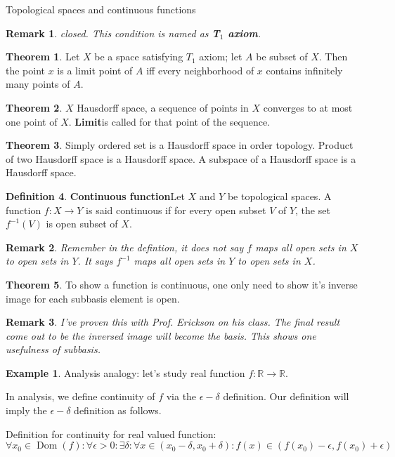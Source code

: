 \documentclass{report}
\newtheorem*{remark}{Remark}
\theoremstyle{definition}
\newtheorem{theorem}{Theorem}[chapter]
\newtheorem{definition}[theorem]{Definition}
\newtheorem{example}{Example}[theorem]
\newcommand{\defn}[1]{\textbf{#1}\label{#1}\index{#1}}
\newcommand{\RR}{\mathbb{R}}
\begin{document}
\begin{chapter}{Topological spaces and continuous functions}
\begin{remark}
    closed. This condition is named as \defn{T$_1$ axiom}.
  \end{remark}
  \begin{theorem}
    Let $X$ be a space satisfying $T_1$ axiom; let $A$ be subset of
    $X$. Then the point $x$ is a limit point of $A$ iff every
    neighborhood of $x$ contains infinitely many points of $A$.
  \end{theorem}
  \begin{theorem}
    $X$ Hausdorff space, a sequence of points in $X$ converges to at
    most one point of $X$. \defn{Limit} is called for that point
    of the sequence.
  \end{theorem}
  \begin{theorem}
    Simply ordered set is a Hausdorff space in order topology.
    Product of two Hausdorff space is a Hausdorff space.
    A subspace of a Hausdorff space is a Hausdorff space.
  \end{theorem}
  \begin{definition}\defn{Continuous function}
    Let $X$ and $Y$ be topological spaces. A function $f:X\to Y$ is
    said continuous if for every open subset $V$ of $Y$, the set
    $f^{-1}(V)$ is open subset of $X$.
  \end{definition}
  \begin{remark}
    Remember in the defintion, it does not say $f$ maps all open sets
    in $X$ to open sets in $Y$. It says $f^{-1}$ maps all open sets in
    $Y$ to open sets in $X$.
  \end{remark}
  \begin{theorem}
    To show a function is continuous, one only need to show it's
    inverse image for each subbasis element is open.
  \end{theorem}
  \begin{remark}
    I've proven this with Prof. Erickson on his class. The final
    result come out to be the inversed image will become the basis.
    This shows one usefulness of subbasis.
  \end{remark}
  \begin{example}
    Analysis analogy: let's study real function $f : \RR \to \RR$.

    In analysis, we define continuity of $f$ via the $\epsilon-\delta$
    definition. Our definition will imply the $\epsilon-\delta$
    definition as follows.

    Definition for continuity for real valued function: \\
    $\forall x_0\in \operatorname{Dom}(f):\forall \epsilon>0:\exists \delta: \forall
    x\in(x_0-\delta,x_0+\delta):
    f(x)\in(f(x_0)-\epsilon,f(x_0)+\epsilon)$


\end{example}
\end{chapter}
\end{document}

